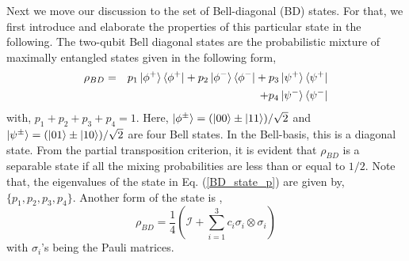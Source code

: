 

Next we move our discussion to the set of Bell-diagonal (BD) states. For that, we first introduce and elaborate the properties of this particular state in the following. The two-qubit Bell diagonal states are the probabilistic mixture of maximally entangled states given in the following form,
\begin{eqnarray}
    \rho_{BD} &=& p_1 \ket{\phi^+}\bra{\phi^+} + p_2 \ket{\phi^-}\bra{\phi^-} + p_3 \ket{\psi^+}\bra{\psi^+} \nonumber \\
    && + p_4 \ket{\psi^-}\bra{\psi^-}
    \label{BD_state_p}
\end{eqnarray}
with, $p_1+p_2+p_3+p_4=1$. Here, $\ket{\phi^{\pm}}=(\ket{00}\pm \ket{11})/\sqrt{2}$ and $\ket{\psi^{\pm}}=(\ket{01}\pm \ket{10})/\sqrt{2}$ are four Bell states. In the Bell-basis, this is a diagonal state. From the partial transposition criterion, it is evident that $\rho_{BD}$ is a separable state if all the mixing probabilities are less than or equal to $1/2$. Note that, the eigenvalues of the state in Eq. (\ref{BD_state_p}) are given by, $\{ p_1, p_2, p_3, p_4\}$. Another form of the state is \cite{LC_10},
\begin{equation}
    \rho_{BD} = \frac{1}{4} (\mathcal{I}+\sum_{i=1}^3 c_i \sigma_i \otimes \sigma_i)
    \label{BD_state_c}
\end{equation}
with $\sigma_i$'s being the Pauli matrices.

